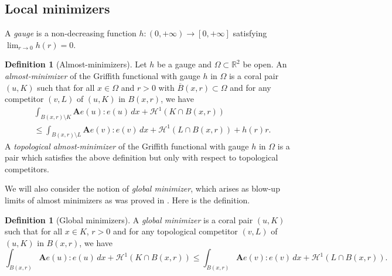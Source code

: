 \documentclass[12pt]{article}
\theoremstyle{definition}
\newtheorem{definition}[theorem]{Definition}
\theoremstyle{remark}
\numberwithin{equation}{section}
\newcommand{\R}{\mathbb{R}}
\newcommand{\A}{\mathbf{A}}
\renewcommand{\H}{\mathcal{H}}
\begin{document}
\subsection{Local minimizers}

A \emph{gauge} is a non-decreasing function $h \colon (0,+\infty) \longrightarrow [0,+\infty]$ satisfying $\lim_{r\to 0} h(r)=0$.
\begin{definition}[Almost-minimizers]\label{defAlmostMin}
    Let $h$ be a gauge and $\Omega \subset \R^2$ be open. An \emph{almost-minimizer} of the Griffith functional with
    gauge $h$ in $\Omega$ is a coral pair $(u,K)$ such that for all $x \in \Omega$ and $r > 0$ with $\overline{B}(x,r)
    \subset \Omega$ and for any competitor $(v,L)$ of $(u,K)$ in $B(x,r)$, we have
    \begin{multline*}
        \int_{B(x,r) \setminus K} \A e(u):e(u) \,dx + \H^1(K \cap B(x,r))
        \\\leq \int_{B(x,r) \setminus L} \A e(v) : e(v) \,dx + \H^1(L \cap B(x,r)) + h(r) r.
    \end{multline*}
    A \emph{topological almost-minimizer} of the Griffith functional with gauge $h$ in $\Omega$ is a pair which satisfies the above definition but only with respect to topological competitors. 
\end{definition} 

We will also consider the notion of \emph{global minimizer}, which arises as blow-up limits of almost minimizers as was proved in \cite{lablem}. Here is the definition.

\begin{definition}[Global minimizers]
    A \emph{global minimizer} is a coral pair $(u,K)$ such that for all $x \in K$, $r > 0$ and for any topological
    competitor $(v,L)$ of $(u,K)$ in $B(x,r)$, we have
    \begin{equation}
        \int_{B(x,r)} \A e(u):e(u) \,dx+ \H^1(K \cap {B(x,r)})
        \leq \int_{B(x,r)} \A e(v) : e(v) \, dx + \H^1(L \cap B(x,r)).
    \end{equation}
\end{definition} 
\end{document}
